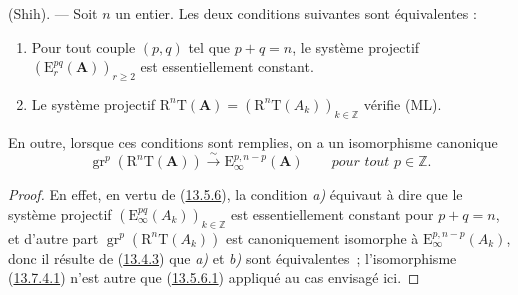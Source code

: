 \begin{proposition}[13.7.4]
\label{0.13.7.4-fr}
(Shih). --- Soit $n$ un entier. Les deux conditions suivantes sont
équivalentes :
\begin{enumerate}
\item[\emph{a)}] Pour tout couple $(p,q)$ tel que $p+q=n$, le
système projectif $(\mathrm E_r^{pq}(\mathbf A))_{r\geq2}$ est
essentiellement constant.
\item[\emph{b)}] Le système projectif
$\mathrm R^n\mathrm T(\mathbf A)=
(\mathrm R^n\mathrm T(A_k))_{k\in\mathbb Z}$ vérifie \textup{(ML)}.
\end{enumerate}
En outre, lorsque ces conditions sont remplies, on a un
isomorphisme canonique
\begin{equation}
\label{0.13.7.4.1-fr}
\tag{13.7.4.1}
\operatorname{gr}^p(\mathrm R^n\mathrm T(\mathbf A))
\xrightarrow{\sim}\mathrm E_\infty^{p,n-p}(\mathbf A)
\qquad\textit{pour tout $p\in\mathbb Z$.}
\end{equation}
\end{proposition}
\begin{proof}
En effet, en vertu de (\hyperref[0.13.5.6-fr]{13.5.6}), la condition
\emph{a)} équivaut à dire que le système projectif
$(\mathrm E_\infty^{pq}(A_k))_{k\in\mathbb Z}$ est essentiellement
constant pour $p+q=n$, et d'autre part
$\operatorname{gr}^p(\mathrm R^n\mathrm T(A_k))$ est canoniquement
isomorphe à $\mathrm E_\infty^{p,n-p}(A_k)$, donc il résulte de
(\hyperref[0.13.4.3-fr]{13.4.3}) que \emph{a)} et \emph{b)} sont
équivalentes~; l'isomorphisme
(\hyperref[0.13.7.4.1-fr]{13.7.4.1}) n'est autre que
(\hyperref[0.13.5.6.1-fr]{13.5.6.1}) appliqué au cas envisagé ici.
\end{proof}

